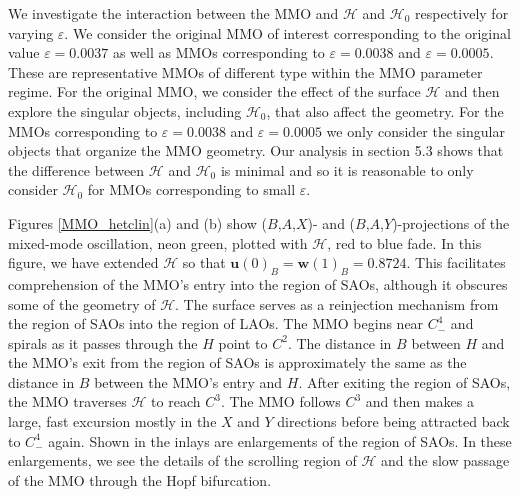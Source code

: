 \documentclass{ws-ijbc}
\begin{document}
We investigate the interaction between the MMO and $\mathscr{H}$ and $\mathscr{H}_0$ respectively for varying $\varepsilon$.  We consider the original MMO of interest corresponding to the original value $\varepsilon=0.0037$ as well as MMOs corresponding to $\varepsilon=0.0038$ and $\varepsilon=0.0005$.  These are representative MMOs of different type within the MMO parameter regime.  For the original MMO, we consider the effect of the surface $\mathscr{H}$ and then explore the singular objects, including $\mathscr{H}_0$, that also affect the geometry.  For the MMOs corresponding to $\varepsilon=0.0038$ and $\varepsilon=0.0005$ we only consider the singular objects that organize the MMO geometry.  Our analysis in section 5.3 shows that the difference between $\mathscr{H}$ and $\mathscr{H}_0$ is minimal and so it is reasonable to only consider $\mathscr{H}_0$ for MMOs corresponding to small $\varepsilon$.

Figures \ref{MMO_hetclin}(a) and (b)  show ($B$,$A$,$X$)- and ($B$,$A$,$Y$)-projections of the mixed-mode oscillation, neon green, plotted with $\mathscr{H}$, red to blue fade.  In this figure, we have extended $\mathscr{H}$ so that $\mathbf{u}(0)_B = \mathbf{w}(1)_B = 0.8724$. This facilitates comprehension of the MMO's entry into the region of SAOs, although it obscures some of the geometry of $\mathscr{H}$.  The surface serves as a reinjection mechanism from the region of SAOs into the region of LAOs.  The MMO begins near $C^4_-$ and spirals as it passes through the $H$ point to $C^2$.  The distance in $B$ between $H$ and the MMO's exit from the region of SAOs is approximately the same as the distance in $B$ between the MMO's entry and $H$.  After exiting the region of SAOs, the MMO traverses $\mathscr{H}$ to reach $C^3$.  The MMO follows $C^3$ and then makes a large, fast excursion mostly in the $X$ and $Y$ directions before being attracted back to $C^4_-$ again.  Shown in the inlays are enlargements of the region of SAOs.  In these enlargements, we see the details of the scrolling region of $\mathscr{H}$ and the slow passage of the MMO through the Hopf bifurcation.
\end{document}
